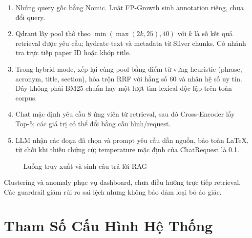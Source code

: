 \begin{enumerate}
\item Nhúng query gốc bằng Nomic. Luật FP-Growth sinh annotation riêng, chưa đổi query.
\item Qdrant lấy pool thô theo $\min(\max(2k,25),40)$ với $k$ là số kết quả retrieval được yêu cầu; hydrate text và metadata từ Silver chunks. Có nhánh tra trực tiếp paper ID hoặc khớp title.
\item Trong hybrid mode, xếp lại cùng pool bằng điểm từ vựng heuristic (phrase, acronym, title, section), hòa trộn RRF với hằng số 60 và nhân hệ số uy tín. Đây không phải BM25 chuẩn hay một lượt tìm lexical độc lập trên toàn corpus.
\item Chat mặc định yêu cầu 8 ứng viên từ retrieval, sau đó Cross-Encoder lấy Top-5; các giá trị có thể đổi bằng cấu hình/request.
\item LLM nhận các đoạn đã chọn và prompt yêu cầu dẫn nguồn, bảo toàn LaTeX, từ chối khi thiếu chứng cứ; temperature mặc định của ChatRequest là 0.1.
\end{enumerate}
\begin{figure}[htbp]
\centering
\DrawRagPipelineDiagram
\caption[Luồng truy xuất và sinh câu trả lời RAG]{Luồng truy xuất và sinh câu trả lời RAG}
\label{fig:rag_pipeline_flow}
\end{figure}
Clustering và anomaly phục vụ dashboard, chưa điều hướng trực tiếp retrieval. Các guardrail giảm rủi ro sai lệch nhưng không bảo đảm loại bỏ ảo giác.

\FloatBarrier
{}
\section{Tham Số Cấu Hình Hệ Thống}

